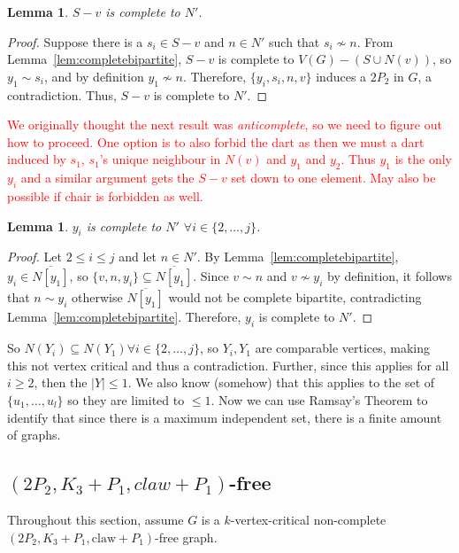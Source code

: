 \documentclass[11pt]{article}
\newtheorem{lemma}[theorem]{Lemma}
\theoremstyle{definition}
\begin{document}
\begin{lemma}\label{lem:S-vcompletetoN'}
$S-v$ is complete to $N'$.
\end{lemma}
\begin{proof}
Suppose there is a $s_i\in S-v$ and $n\in N'$ such that $s_i\nsim n$. From Lemma~\ref{lem:completebipartite}, $S-v$ is complete to $V(G) - (S \cup N(v))$, so $y_1\sim s_i$, and by definition $y_1\nsim n$. Therefore, $\{y_i, s_i, n, v\}$ induces a $2P_2$ in $G$, a contradiction. Thus, $S-v$ is complete to $N'$.
\end{proof}

\textcolor{red}{We originally thought the next result was \textit{anticomplete}, so we need to figure out how to proceed. One option is to also forbid the dart as then we must a dart induced by $s_1$, $s_1$'s unique neighbour in $N(v)$ and $y_1$ and $y_2$. Thus $y_1$ is the only $y_i$ and a similar argument gets the $S-v$ set down to one element. May also be possible if chair is forbidden as well.}
\begin{lemma}\label{lem:yicompletetoN'}
$y_i$ is complete to $N'$ $\forall i \in \{2, \dots, j\}$.
\end{lemma}
\begin{proof}
Let $2\le i\le j$ and let $n\in N'$. By Lemma~\ref{lem:completebipartite}, $y_i\in\overline{N[y_1]}$, so $\{v,n,y_i\}\subseteq \overline{N[y_1]}$. Since $v\sim n$ and $v\nsim y_i$ by definition, it follows that $n\sim y_i$  otherwise $\overline{N[y_1]}$ would not be complete bipartite, contradicting Lemma~\ref{lem:completebipartite}. Therefore, $y_i$ is complete to $N'$.
\end{proof}


So $N(Y_i) \subseteq N(Y_1) \forall i \in \{2, \dots, j\}$, so $Y_i, Y_1$ are comparable vertices, making this not vertex critical and thus a contradiction. Further, since this applies for all $i \geq 2$, then the $|Y| \leq 1$. We also know (somehow) that this applies to the set of $\{u_1, \dots, u_l \}$ so they are limited to $\leq 1$.
Now we can use Ramsay's Theorem to identify that since there is a maximum independent set, there is a finite amount of graphs.

\subsection{$(2P_2, K_3 + P_1, claw + P_1)$-free}

Throughout this section, assume $G$ is a $k$-vertex-critical non-complete $(2P_2, K_3 + P_1, \text{claw} + P_1)$-free graph. 
\end{document}
